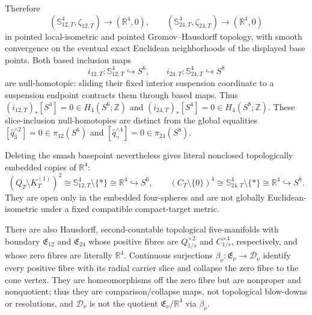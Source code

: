 \begin{enumerate}[leftmargin=1.8em]
\[\]
Therefore
\[
 (\mathbb S_{12,T}^4,\zeta_{12,T})\longrightarrow(\mathbb R^4,0),\qquad
 (\mathbb S_{24,T}^4,\zeta_{24,T})\longrightarrow(\mathbb R^4,0)
\]
in pointed local-isometric and pointed Gromov--Hausdorff topology, with smooth
convergence on the eventual exact Euclidean neighborhoods of the displayed
base points.  Both based inclusion maps
\[
 i_{12,T}:\mathbb S_{12,T}^4\hookrightarrow S^6,
 \qquad
 i_{24,T}:\mathbb S_{24,T}^4\hookrightarrow S^8
\]
are null-homotopic: sliding their fixed interior suspension coordinate to a
suspension endpoint contracts them through based maps.  Thus
\((i_{12,T})_*[S^4]=0\in H_4(S^6;\mathbb Z)\) and
\((i_{24,T})_*[S^4]=0\in H_4(S^8;\mathbb Z)\).  These slice-inclusion
null-homotopies are distinct from the global equalities
\([\widehat q_3^{\wedge2}]=0\in\pi_{12}(S^6)\) and
\([\widehat q_\gamma^{\wedge4}]=0\in\pi_{24}(S^8)\).

Deleting the smash basepoint nevertheless gives literal nonclosed
topologically embedded copies of \(\mathbb R^4\):
\[
 (Q_T\setminus K_T^{(1)})^2
 \cong\mathbb S_{12,T}^4\setminus\{*\}
 \cong\mathbb R^4\hookrightarrow S^6,
\qquad
 (C_T\setminus\{0\})^4
 \cong\mathbb S_{24,T}^4\setminus\{*\}
 \cong\mathbb R^4\hookrightarrow S^8.
\]
They are open only in the embedded four-spheres and are not globally
Euclidean-isometric under a fixed compatible compact-target metric.

There are also Hausdorff, second-countable topological five-manifolds with
boundary \(\mathfrak E_{12}\) and \(\mathfrak E_{24}\) whose positive fibres
are \(Q_{1/s}^{\times2}\) and \(C_{1/s}^{\times4}\), respectively, and whose
zero fibres are literally \(\mathbb R^4\).  Continuous surjections
\(\beta_\nu:\mathfrak E_\nu\to\mathcal D_\nu\) identify every positive fibre
with its radial carrier slice and collapse the zero fibre to the cone vertex.
They are homeomorphisms off the zero fibre but are nonproper and nonquotient;
thus they are comparison/collapse maps, not topological blow-downs or
resolutions, and \(\mathcal D_\nu\) is not the quotient
\(\mathfrak E_\nu/\mathbb R^4\) via \(\beta_\nu\).


\end{enumerate}
